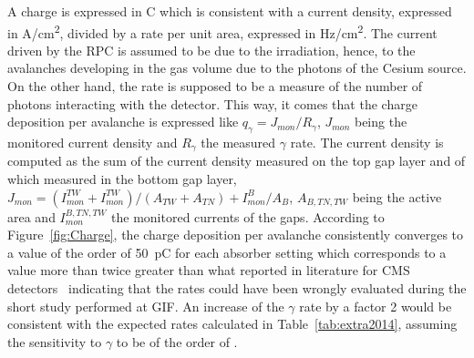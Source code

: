 	A charge is expressed in \si{C} which is consistent with a current density, expressed in \si{A/cm^2}, divided by a rate per unit area, expressed in \si{Hz/cm^2}. The current driven by the RPC is assumed to be due to the irradiation, hence, to the avalanches developing in the gas volume due to the photons of the Cesium source. On the other hand, the rate is supposed to be a measure of the number of photons interacting with the detector. This way, it comes that the charge deposition per avalanche is expressed like $q_\gamma = J_{mon}/R_\gamma$, $J_{mon}$ being the monitored current density and $R_\gamma$ the measured $\gamma$ rate. The current density is computed as the sum of the current density measured on the top gap layer and of which measured in the bottom gap layer, $J_{mon} = (I_{mon}^{TW}+I_{mon}^{TW})/(A_{TW}+A_{TN}) + I_{mon}^B/A_B$, $A_{B,TN,TW}$ being the active area and $I_{mon}^{B,TN,TW}$ the monitored currents of the gaps. According to Figure~\ref{fig:Charge}, the charge deposition per avalanche consistently converges to a value of the order of \SI{50}{pC} for each absorber setting which corresponds to a value more than twice greater than what reported in literature for CMS detectors~\cite{PUGLIESE2002,PUGLIESE2003} indicating that the rates could have been wrongly evaluated during the short study performed at GIF. An increase of the $\gamma$ rate by a factor 2 would be consistent with the expected rates calculated in Table~\ref{tab:extra2014}, assuming the sensitivity to $\gamma$ to be of the order of .
	
